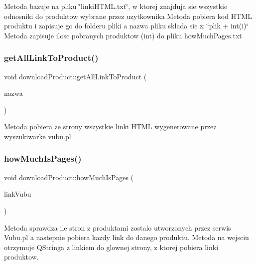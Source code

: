 Metoda bazuje na pliku \char`\"{}linki\+H\+T\+M\+L.\+txt\char`\"{}, w ktorej znajduja sie wszystkie odnosniki do produktow wybrane przez uzytkownika Metoda pobiera kod H\+T\+ML produktu i zapisuje go do folderu pliki a nazwa pliku sklada sie z\+: \char`\"{}plik + int(i)\char`\"{} Metoda zapisuje ilosc pobranych produktow (int) do pliku how\+Much\+Pages.\+txt \mbox{\label{classdownload_product_a7102ffd5250743cbc9c5e74ea78dc686}} 
\subsubsection{\texorpdfstring{get\+All\+Link\+To\+Product()}{getAllLinkToProduct()}}
{\footnotesize\ttfamily void download\+Product\+::get\+All\+Link\+To\+Product (\begin{DoxyParamCaption}\item[{string}]{nazwa }\end{DoxyParamCaption})\hspace{0.3cm}{\ttfamily [private]}}



Metoda pobiera ze strony wszystkie linki H\+T\+ML wygenerowane przez wyszukiwarke vubu.\+pl. 

\mbox{\label{classdownload_product_a383a290dfb6c4916e1e192a61626e364}} 
\subsubsection{\texorpdfstring{how\+Much\+Is\+Pages()}{howMuchIsPages()}}
{\footnotesize\ttfamily void download\+Product\+::how\+Much\+Is\+Pages (\begin{DoxyParamCaption}\item[{Q\+String}]{link\+Vubu }\end{DoxyParamCaption})}

Metoda sprawdza ile stron z produktami zostalo utworzonych przez serwis Vubu.\+pl a nastepnie pobiera kazdy link do danego produktu. Metoda na wejsciu otrzymuje Q\+Stringa z linkiem do glownej strony, z ktorej pobiera linki produktow. 

